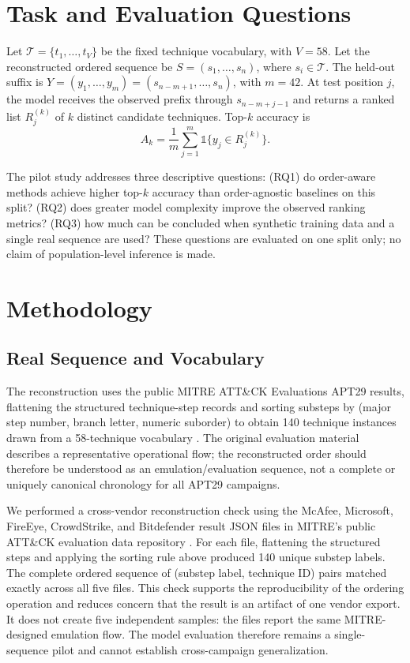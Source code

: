 \documentclass[conference]{IEEEtran}
\begin{document}
\section{Task and Evaluation Questions}
Let $\mathcal{T}=\{t_1,\ldots,t_V\}$ be the fixed technique vocabulary, with $V=58$. Let the reconstructed ordered sequence be $S=(s_1,\ldots,s_n)$, where $s_i\in\mathcal{T}$. The held-out suffix is $Y=(y_1,\ldots,y_m)=(s_{n-m+1},\ldots,s_n)$, with $m=42$. At test position $j$, the model receives the observed prefix through $s_{n-m+j-1}$ and returns a ranked list $R_j^{(k)}$ of $k$ distinct candidate techniques. Top-$k$ accuracy is
\begin{equation}
 A_k=\frac{1}{m}\sum_{j=1}^{m}\mathbb{1}\{y_j\in R_j^{(k)}\}.
\end{equation}

The pilot study addresses three descriptive questions: (RQ1) do order-aware methods achieve higher top-$k$ accuracy than order-agnostic baselines on this split? (RQ2) does greater model complexity improve the observed ranking metrics? (RQ3) how much can be concluded when synthetic training data and a single real sequence are used? These questions are evaluated on one split only; no claim of population-level inference is made.

\section{Methodology}
\subsection{Real Sequence and Vocabulary}
The reconstruction uses the public MITRE ATT\&CK Evaluations APT29 results, flattening the structured technique-step records and sorting substeps by (major step number, branch letter, numeric suborder) to obtain 140 technique instances drawn from a 58-technique vocabulary \cite{mitreApt29,mitreJoystick}. The original evaluation material describes a representative operational flow; the reconstructed order should therefore be understood as an emulation/evaluation sequence, not a complete or uniquely canonical chronology for all APT29 campaigns.

We performed a cross-vendor reconstruction check using the McAfee, Microsoft, FireEye, CrowdStrike, and Bitdefender result JSON files in MITRE's public ATT\&CK evaluation data repository \cite{mitreJoystick}. For each file, flattening the structured steps and applying the sorting rule above produced 140 unique substep labels. The complete ordered sequence of (substep label, technique ID) pairs matched exactly across all five files. This check supports the reproducibility of the ordering operation and reduces concern that the result is an artifact of one vendor export. It does not create five independent samples: the files report the same MITRE-designed emulation flow. The model evaluation therefore remains a single-sequence pilot and cannot establish cross-campaign generalization.
\end{document}
